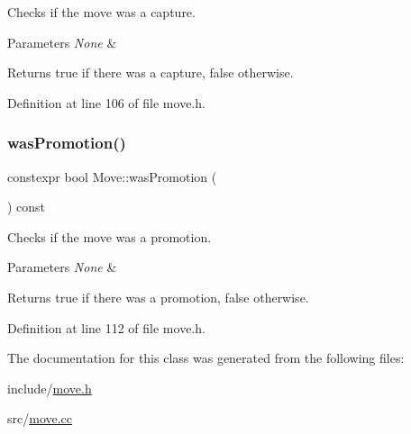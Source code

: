 Checks if the move was a capture. 


\begin{DoxyParams}{Parameters}
{\em None} & \\
\hline
\end{DoxyParams}
\begin{DoxyReturn}{Returns}
true if there was a capture, false otherwise. 
\end{DoxyReturn}


Definition at line 106 of file move.\+h.

\mbox{\label{classMove_a06483745a13016873fc99db2ea74e042}} 
\subsubsection{\texorpdfstring{was\+Promotion()}{wasPromotion()}}
{\footnotesize\ttfamily constexpr bool Move\+::was\+Promotion (\begin{DoxyParamCaption}{ }\end{DoxyParamCaption}) const\hspace{0.3cm}{\ttfamily [inline]}}



Checks if the move was a promotion. 


\begin{DoxyParams}{Parameters}
{\em None} & \\
\hline
\end{DoxyParams}
\begin{DoxyReturn}{Returns}
true if there was a promotion, false otherwise. 
\end{DoxyReturn}


Definition at line 112 of file move.\+h.



The documentation for this class was generated from the following files\+:\begin{DoxyCompactItemize}
\item 
include/\mbox{\hyperlink{move_8h}{move.\+h}}\item 
src/\mbox{\hyperlink{move_8cc}{move.\+cc}}\end{DoxyCompactItemize}
